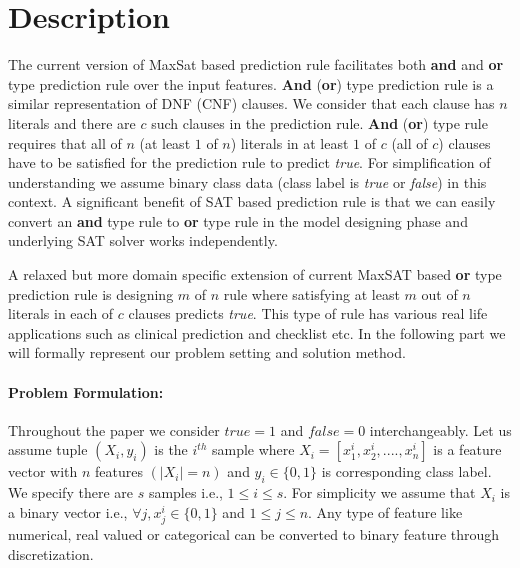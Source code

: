 


\section{Description}
The current version of MaxSat based prediction rule facilitates both \textbf{and} and \textbf{or} type prediction rule over the  input features. \textbf{And} (\textbf{or}) type prediction rule is a similar representation of DNF (CNF) clauses. We consider that each clause has $ n $ literals and there are $ c $ such clauses in the prediction rule. \textbf{And} (\textbf{or}) type rule requires that  all  of $ n $ (at least $ 1 $ of $ n $) literals in  at least $ 1 $ of  $ c $ (all of $ c $)  clauses have to be satisfied for the prediction rule to predict \textit{true}. For simplification of understanding we assume binary class data (class label is  \textit{true} or \textit{false}) in this context. A significant benefit of SAT based prediction rule is that we can easily convert an \textbf{and} type rule to \textbf{or} type rule in the model designing phase and underlying SAT solver  works independently.
	
	A relaxed but more domain specific extension of current MaxSAT based \textbf{or} type prediction rule is designing $ m $ of $ n $ rule where satisfying at least $ m $  out of $ n $ literals  in each of $ c $ clauses predicts \textit{true}. This type of rule has various real life applications such as clinical prediction and checklist etc. In the following part we will formally represent our problem setting and solution method.
	
	
	\paragraph{Problem Formulation:} Throughout the paper we consider $true =1 $ and $ false=0 $ interchangeably. Let us assume tuple $ (X_i,y_i)$ is the  $ i^{th} $ sample where $ X_i=[x_1^i,x_2^i,....,x_n^i] $ is a feature vector with  $ n $ features  $( |X_i|=n )$ and $ y_i \in \{0,1\}$ is corresponding class label. We specify there are $ s $ samples i.e., $ 1 \le i\le s $.  For simplicity we assume that $ X_i $ is a binary vector i.e., $\forall j,  x_j^i \in \{0,1\}  $ and $ 1\le j \le n $.  Any type of feature like numerical, real valued or categorical can be converted to binary feature through discretization.  
	
